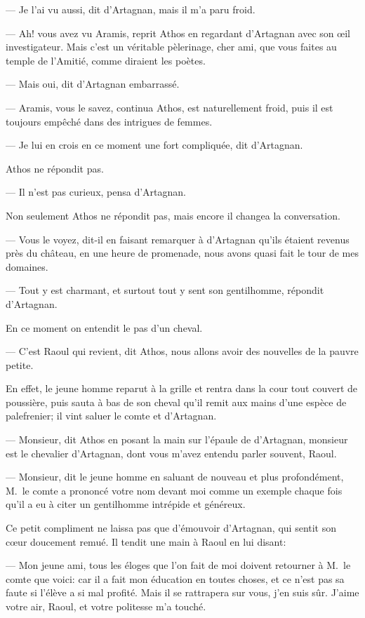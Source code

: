 — Je l'ai vu aussi, dit d'Artagnan, mais il m'a paru froid.

— Ah! vous avez vu Aramis, reprit Athos en regardant d'Artagnan avec son œil investigateur. Mais c'est un véritable pèlerinage, cher ami, que vous faites au temple de l'Amitié, comme diraient les poètes.

— Mais oui, dit d'Artagnan embarrassé.

— Aramis, vous le savez, continua Athos, est naturellement froid, puis il est toujours empêché dans des intrigues de femmes.

— Je lui en crois en ce moment une fort compliquée, dit d'Artagnan.

Athos ne répondit pas.

— Il n'est pas curieux, pensa d'Artagnan.

Non seulement Athos ne répondit pas, mais encore il changea la conversation.

— Vous le voyez, dit-il en faisant remarquer à d'Artagnan qu'ils étaient revenus près du château, en une heure de promenade, nous avons quasi fait le tour de mes domaines.

— Tout y est charmant, et surtout tout y sent son gentilhomme, répondit d'Artagnan.

En ce moment on entendit le pas d'un cheval.

— C'est Raoul qui revient, dit Athos, nous allons avoir des nouvelles de la pauvre petite.

En effet, le jeune homme reparut à la grille et rentra dans la cour tout couvert de poussière, puis sauta à bas de son cheval qu'il remit aux mains d'une espèce de palefrenier; il vint saluer le comte et d'Artagnan.

— Monsieur, dit Athos en posant la main sur l'épaule de d'Artagnan, monsieur est le chevalier d'Artagnan, dont vous m'avez entendu parler souvent, Raoul.

— Monsieur, dit le jeune homme en saluant de nouveau et plus profondément, M.~le comte a prononcé votre nom devant moi comme un exemple chaque fois qu'il a eu à citer un gentilhomme intrépide et généreux.

Ce petit compliment ne laissa pas que d'émouvoir d'Artagnan, qui sentit son cœur doucement remué. Il tendit une main à Raoul en lui disant:

— Mon jeune ami, tous les éloges que l'on fait de moi doivent retourner à M.~le comte que voici: car il a fait mon éducation en toutes choses, et ce n'est pas sa faute si l'élève a si mal profité. Mais il se rattrapera sur vous, j'en suis sûr. J'aime votre air, Raoul, et votre politesse m'a touché.

